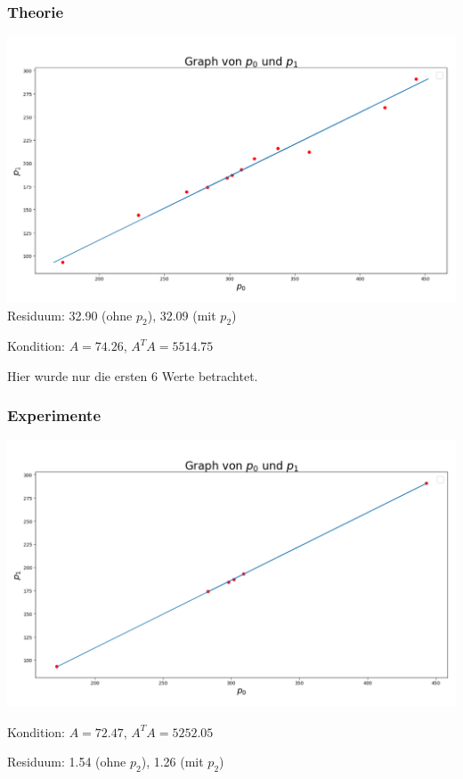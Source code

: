 \documentclass{beamer}
\begin{document}
\begin{frame}
    \frametitle{Theorie}
    \includegraphics[width=\textwidth]{plot.png}
    Residuum: 32.90 (ohne \(p_2\)), 32.09 (mit \(p_2\))

    Kondition: \(A = 74.26\), \(A^T A = 5514.75\)
\end{frame}

\begin{frame}
Hier wurde nur die ersten 6 Werte betrachtet.

\frametitle{Experimente}
\includegraphics[width=\textwidth]{plot1.png}

Kondition: $A = 72.47$, $A^T A = 5252.05$

Residuum: 1.54 (ohne $p_2$), 1.26 (mit $p_2$)
\end{frame}
\end{document}
